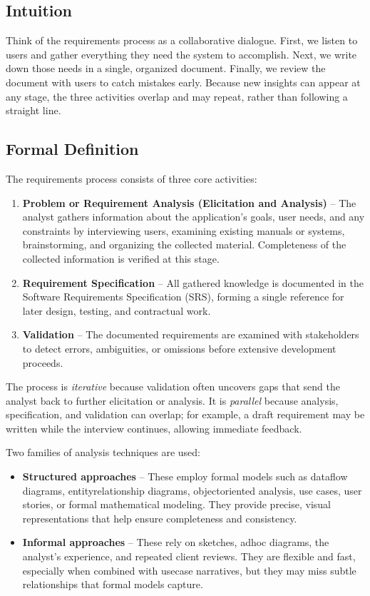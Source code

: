 \documentclass[12pt, a4paper]{article}
\begin{document}
\subsection{Intuition}
Think of the requirements process as a collaborative dialogue. First, we listen to users and gather everything they need the system to accomplish. Next, we write down those needs in a single, organized document. Finally, we review the document with users to catch mistakes early. Because new insights can appear at any stage, the three activities overlap and may repeat, rather than following a straight line.

\subsection{Formal Definition}
The requirements process consists of three core activities:

\begin{enumerate}
\item \textbf{Problem or Requirement Analysis (Elicitation and Analysis)} -- The analyst gathers information about the application's goals, user needs, and any constraints by interviewing users, examining existing manuals or systems, brainstorming, and organizing the collected material. Completeness of the collected information is verified at this stage.
\item \textbf{Requirement Specification} -- All gathered knowledge is documented in the Software Requirements Specification (SRS), forming a single reference for later design, testing, and contractual work.
\item \textbf{Validation} -- The documented requirements are examined with stakeholders to detect errors, ambiguities, or omissions before extensive development proceeds.
\end{enumerate}

The process is \emph{iterative} because validation often uncovers gaps that send the analyst back to further elicitation or analysis. It is \emph{parallel} because analysis, specification, and validation can overlap; for example, a draft requirement may be written while the interview continues, allowing immediate feedback.

Two families of analysis techniques are used:

\begin{itemize}
\item \textbf{Structured approaches} -- These employ formal models such as dataflow diagrams, entityrelationship diagrams, objectoriented analysis, use cases, user stories, or formal mathematical modeling. They provide precise, visual representations that help ensure completeness and consistency.
\item \textbf{Informal approaches} -- These rely on sketches, adhoc diagrams, the analyst's experience, and repeated client reviews. They are flexible and fast, especially when combined with usecase narratives, but they may miss subtle relationships that formal models capture.
\end{itemize}
\end{document}
